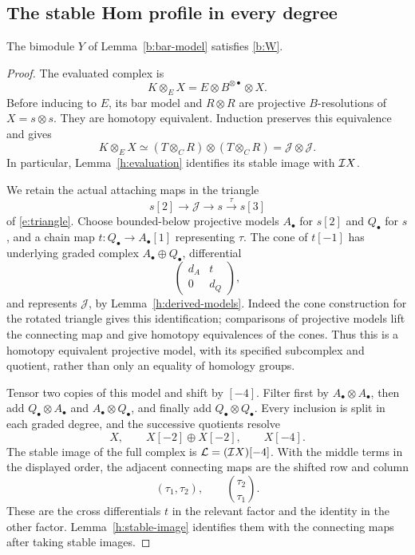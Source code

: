\subsection{The stable Hom profile in every degree}

\begin{lemma}\label{b:profile}
The bimodule \(Y\) of Lemma~\ref{b:bar-model} satisfies
\eqref{b:W}.
\end{lemma}

\begin{proof}
The evaluated complex is
\[
 K\otimes_E X=E\otimes B^{\otimes\bullet}\otimes X.
\]
Before inducing to \(E\), its bar model and \(R\otimes R\) are
projective \(B\)-resolutions of \(X=s\otimes s\).  They are homotopy
equivalent.  Induction preserves this equivalence and gives
\begin{equation}\label{b:evaluated-model}
 K\otimes_E X\simeq
 (T\otimes_C R)\otimes(T\otimes_C R)
 =\mathcal J\otimes\mathcal J .
\end{equation}
In particular, Lemma~\ref{h:evaluation} identifies its stable image
with \(\mathcal I X\).

We retain the actual attaching maps in the triangle
\[
 s[2]\longrightarrow\mathcal J\longrightarrow s
       \xrightarrow{\tau}s[3]
\]
of \eqref{e:triangle}.  Choose bounded-below projective
models \(A_\bullet\) for \(s[2]\) and \(Q_\bullet\) for \(s\), and a
chain map \(t:Q_\bullet\to A_\bullet[1]\) representing \(\tau\).
The cone of \(t[-1]\) has underlying graded complex
\(A_\bullet\oplus Q_\bullet\), differential
\[
 \begin{pmatrix}d_A&t\\0&d_Q\end{pmatrix},
\]
and represents \(\mathcal J\), by Lemma~\ref{h:derived-models}.
Indeed the cone construction for the rotated triangle gives this
identification; comparisons of projective
models lift the connecting map and give homotopy equivalences of the
cones.  Thus this is a homotopy equivalent projective model, with its
specified subcomplex and quotient, rather than only an equality of
homology groups.

Tensor two copies of this model and shift by \([-4]\).
Filter first by \(A_\bullet\otimes A_\bullet\), then add
\(Q_\bullet\otimes A_\bullet\) and \(A_\bullet\otimes Q_\bullet\),
and finally add \(Q_\bullet\otimes Q_\bullet\).
Every inclusion is split in each graded degree, and the successive
quotients resolve
\begin{equation}\label{b:three-levels}
 X,\qquad X[-2]\oplus X[-2],\qquad X[-4].
\end{equation}
The stable image of the full complex is
\(\mathcal L=(\mathcal I X)[-4]\).
With the middle terms in the displayed order, the adjacent
connecting maps are the shifted row and column
\[
  (\tau_1,\tau_2),\qquad
  \binom{\tau_2}{\tau_1}.
\]
These are the cross differentials \(t\) in the relevant factor and
the identity in the other factor.  Lemma~\ref{h:stable-image}
identifies them with the connecting maps after taking stable images.


\end{proof}

